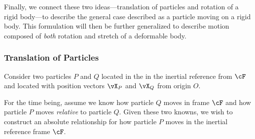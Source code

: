 Finally, we connect these two ideas---translation of particles and rotation
of a rigid body---to describe the general case described as a particle
moving on a rigid body.  This formulation will then be further generalized
to describe motion composed of {\em both} rotation and stretch of a 
deformable body.

\subsubsection{Translation of Particles}
Consider two particles $P$ and $Q$ located in the in the 
inertial reference from $\cF$ and located with position vectors
$\vX_{P}$ and $\vX_{Q}$ from origin $O$.

For the time being, assume we know how particle $Q$ moves
in frame $\cF$ and how particle $P$ moves {\em relative} to 
particle $Q$.  Given these two knowns, we wish to construct 
an absolute relationship for how particle $P$ moves in the
inertial reference frame $\cF$.

